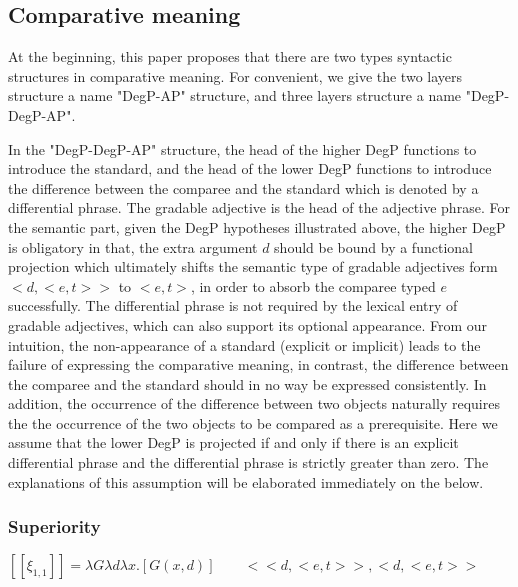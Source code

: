 \documentclass{ctexart}
\begin{document}
\subsection{Comparative meaning}

At the beginning, this paper proposes that there are two types syntactic structures in comparative meaning. For convenient, we give the two layers structure a name "DegP-AP" structure, and three layers structure a name "DegP-DegP-AP". 

In the "DegP-DegP-AP" structure, the head of the higher DegP functions to introduce the standard, and the head of the lower DegP functions to introduce the difference between the comparee and the standard which is denoted by a differential phrase. The gradable adjective is the head of the adjective phrase. For the semantic part, given the DegP hypotheses illustrated above, the higher DegP is obligatory in that, the extra argument $d$ should be bound by a functional projection which ultimately shifts the semantic type of gradable adjectives form $<d,<e,t>>$ to $<e,t>$, in order to absorb the comparee typed $e$ successfully. The differential phrase is not required by the lexical entry of gradable adjectives, which can also support its optional appearance. From our intuition, the non-appearance of a standard (explicit or implicit) leads to the failure of expressing the comparative meaning, in contrast, the difference between the comparee and the standard should in no way be expressed consistently. In addition, the occurrence of the difference between two objects naturally requires the the occurrence of the two objects to be compared as a prerequisite. Here we assume that the lower DegP is projected if and only if there is an explicit differential phrase and the differential phrase is strictly greater than zero. The explanations of this assumption will be elaborated immediately on the below.







\subsubsection{Superiority}



$[\![\xi_{1,1}]\!]=\lambda G \lambda d \lambda x .[G(x,d)] \qquad <<d,<e,t>>,<d,<e,t>>$
\end{document}
